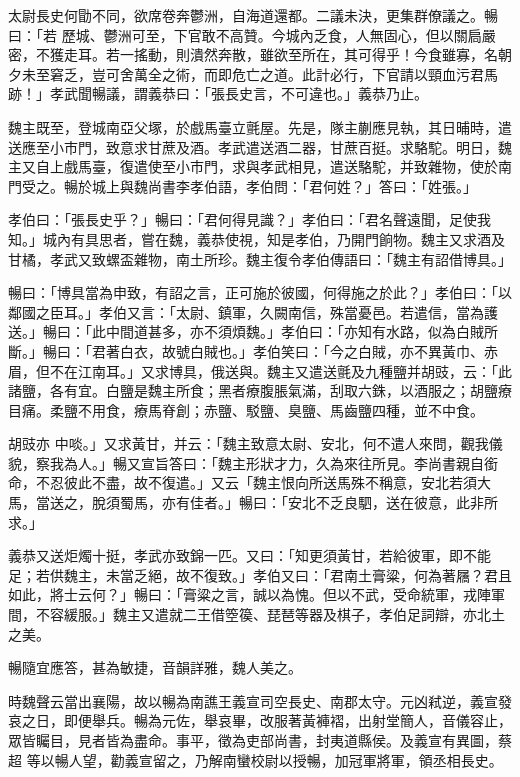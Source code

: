 \begin{pinyinscope}
 太尉長史何勖不同，欲席卷奔鬱洲，自海道還都。二議未決，更集群僚議之。暢曰：「若
 歷城、鬱洲可至，下官敢不高贊。今城內乏食，人無固心，但以關扃嚴密，不獲走耳。若一搖動，則潰然奔散，雖欲至所在，其可得乎！今食雖寡，名朝夕未至窘乏，豈可舍萬全之術，而即危亡之道。此計必行，下官請以頸血污君馬跡！」孝武聞暢議，謂義恭曰：「張長史言，不可違也。」義恭乃止。



 魏主既至，登城南亞父塚，於戲馬臺立氈屋。先是，隊主蒯應見執，其日晡時，遣送應至小市門，致意求甘蔗及酒。孝武遣送酒二器，甘蔗百挺。求駱駝。明日，魏
 主又自上戲馬臺，復遣使至小市門，求與孝武相見，遣送駱駝，并致雜物，使於南門受之。暢於城上與魏尚書李孝伯語，孝伯問：「君何姓？」答曰：「姓張。」



 孝伯曰：「張長史乎？」暢曰：「君何得見識？」孝伯曰：「君名聲遠聞，足使我知。」城內有具思者，嘗在魏，義恭使視，知是孝伯，乃開門餉物。魏主又求酒及甘橘，孝武又致螺盃雜物，南土所珍。魏主復令孝伯傳語曰：「魏主有詔借博具。」



 暢曰：「博具當為申致，有詔之言，正可施於彼國，何得施之於此？」孝伯曰：「以
 鄰國之臣耳。」孝伯又言：「太尉、鎮軍，久闕南信，殊當憂邑。若遣信，當為護送。」暢曰：「此中間道甚多，亦不須煩魏。」孝伯曰：「亦知有水路，似為白賊所斷。」暢曰：「君著白衣，故號白賊也。」孝伯笑曰：「今之白賊，亦不異黃巾、赤眉，但不在江南耳。」又求博具，俄送與。魏主又遣送氈及九種鹽并胡豉，云：「此諸鹽，各有宜。白鹽是魏主所食；黑者療腹脹氣滿，刮取六銖，以酒服之；胡鹽療目痛。柔鹽不用食，療馬脊創；赤鹽、駁鹽、臭鹽、馬齒鹽四種，並不中食。



 胡豉亦
 中啖。」又求黃甘，并云：「魏主致意太尉、安北，何不遣人來問，觀我儀貌，察我為人。」暢又宣旨答曰：「魏主形狀才力，久為來往所見。李尚書親自銜命，不忍彼此不盡，故不復遣。」又云「魏主恨向所送馬殊不稱意，安北若須大馬，當送之，脫須蜀馬，亦有佳者。」暢曰：「安北不乏良駟，送在彼意，此非所求。」



 義恭又送炬燭十挺，孝武亦致錦一匹。又曰：「知更須黃甘，若給彼軍，即不能足；若供魏主，未當乏絕，故不復致。」孝伯又曰：「君南土膏粱，何為著屩？君且
 如此，將士云何？」暢曰：「膏粱之言，誠以為愧。但以不武，受命統軍，戎陣軍間，不容緩服。」魏主又遣就二王借箜篌、琵琶等器及棋子，孝伯足詞辯，亦北土之美。



 暢隨宜應答，甚為敏捷，音韻詳雅，魏人美之。



 時魏聲云當出襄陽，故以暢為南譙王義宣司空長史、南郡太守。元凶弒逆，義宣發哀之日，即便舉兵。暢為元佐，舉哀畢，改服著黃褲褶，出射堂簡人，音儀容止，眾皆矚目，見者皆為盡命。事平，徵為吏部尚書，封夷道縣侯。及義宣有異圖，蔡超
 等以暢人望，勸義宣留之，乃解南蠻校尉以授暢，加冠軍將軍，領丞相長史。




\end{pinyinscope}
